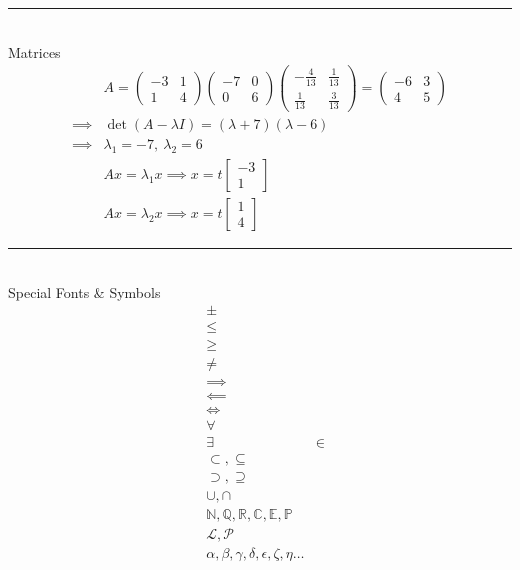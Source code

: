 \documentclass[11pt,a4paper]{article}
\begin{document}
\noindent\rule{\textwidth}{0.6pt} \\
{\large Matrices}
\begin{align*}
    & A =
    \begin{pmatrix}
        -3 & 1 \\
        1  & 4
    \end{pmatrix}
    \begin{pmatrix}
        -7 & 0 \\
        0  & 6 
    \end{pmatrix}
    \begin{pmatrix}
        -\frac{4}{13}  &  \frac{1}{13} \\[6pt]
        \frac{1}{13}   &  \frac{3}{13}
    \end{pmatrix} = 
    \begin{pmatrix}
        -6 & 3 \\
        4 & 5
    \end{pmatrix} \\[12pt]
    \implies & \det (A - \lambda I) = (\lambda + 7)(\lambda - 6) \\
    \implies & \lambda_1 = -7,\ \lambda_2 = 6 \\[15pt] 
    & Ax = \lambda_1 x \implies x = t\begin{bmatrix}
        -3 \\
        1
    \end{bmatrix} \\
    & Ax = \lambda_2 x \implies x = t\begin{bmatrix}
        1 \\
        4
    \end{bmatrix}
\end{align*}

\noindent\rule{\textwidth}{0.6pt} \\
{\large Special Fonts \& Symbols}
\begin{align*}
    &\pm         \tag{``plus minus''} \\
    &\leq        \tag{``lesser or equal''} \\
    &\geq        \tag{``greater or equal''} \\
    &\neq        \tag{``not equal''} \\
    &\implies    \\
    &\impliedby  \\
    &\iff        \tag{``if and only if''} \\
    &\forall     \\
    &\exists
    &\in         \\
    &\subset, \subseteq         \tag{``subset or equal''} \\
    &\supset, \supseteq         \tag{``superset or equal''} \\
    &\cup, \cap \\
    &\mathbb{N}, \mathbb{Q}, \mathbb{R}, \mathbb{C}, \mathbb{E}, \mathbb{P}                  \tag{``Blackboard Bold''} \\
    &\mathcal{L}, \mathcal{P}   \tag{``Caligraphic''} \\
    &\alpha, \beta, \gamma, \delta, \epsilon, \zeta, \eta \dots
\end{align*}
\end{document}
